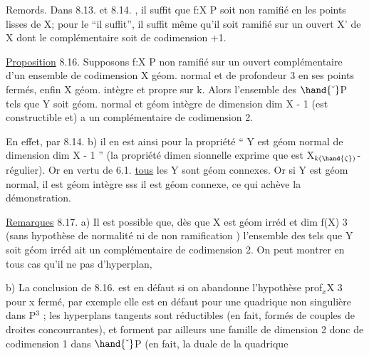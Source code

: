 

Remords. Dans 8.13. et 8.14. , il suffit  que f:X\hand{$\to$} P soit non
ramifié en les points lisses de X; pour le ``il suffit'', il suffit même
qu'il soit  ramifié sur un ouvert X' de X dont le complémentaire soit
de codimension \hand{$\geqslant$} +1.

\uline{Proposition} 8.16. Supposons f:X\hand{$\to$} P non ramifié sur un ouvert
complémentaire d'un ensemble de codimension  X géom. normal et
de profondeur\hand{$\geqslant$} 3 en ses points fermés, enfin X géom. intègre et propre
sur k. Alors l'ensemble des \hand{$\zeta \in$} $\hand{\check{\ }}$P tels que 
Y\hand{$_\zeta$} soit géom. normal et géom intègre de dimension dim X - 1 (est
constructible et) a un complémentaire de codimension \hand{$\geqslant$} 2.

En effet, par 8.14. b) il en est ainsi pour la propriété
`` Y\hand{$_\zeta$} est géom normal de dimension dim X - 1 '' (la propriété dimen
sionnelle exprime que \hand{$\phi_\zeta$} est X$_{k(\hand{\zeta})}$-régulier). Or en vertu de 6.1.
\uline{tous} les Y\hand{$_\zeta$} sont géom connexes. Or si Y\hand{$_\zeta$} est géom normal, il est
géom intègre sss il est géom connexe, ce qui achève la démonstration.

\uline{Remarques} 8.17. a)  Il est possible que, dès que X est géom irréd
et dim f(X) \hand{$\geqslant$} 3 (sans hypothèse de normalité ni de non ramification )
l'ensemble des \hand{$\zeta$} tels que Y\hand{$_\zeta$} soit géom irréd ait un complémentaire
de codimension \hand{$\geqslant$}2. On peut montrer en tous cas qu'il ne pas
d'hyperplan, 

b) La conclusion de 8.16. est en défaut si on abandonne
l'hypothèse prof$_x$X \hand{$\geqslant$} 3 pour x fermé, par exemple elle est en défaut pour
une quadrique non singulière  dans P$^3$ ;   les hyperplans tangents
 sont  réductibles (en fait, formés de couples de droites
concourrantes), et forment par ailleurs une famille de dimension 2
 donc de codimension 1 dans $\hand{\check{\ }}$P (en fait, la duale de la quadrique  
